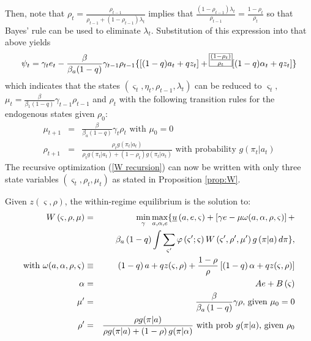 \documentclass[12pt,letter,leqno]{article}
\theoremstyle{asn}
\theoremstyle{lem}
\theoremstyle{slem}
\theoremstyle{prop}
\theoremstyle{appprop}
\theoremstyle{rem}
\theoremstyle{defn}
\begin{document}
Then, note that $\rho _{t}=\frac{\rho _{t-1}}{\rho _{t-1}+(1-\rho
_{t-1})\lambda _{t}}$ implies that $
\frac{(1-\rho _{t-1})\lambda _{t}}{\rho _{t-1}}=\frac{1-\rho _{t}}{\rho _{t}}$ 
so that Bayes' rule can be used to eliminate $\lambda _{t}$.
Substitution of this expression into that above yields%
\begin{equation}
\psi _{t}=\gamma_{t}e_{t}-\frac{\beta }{\beta_{a}(1-q)}\gamma _{t-1}\rho
_{t-1}\{[(1-q)a_{t}+qz_{t}]+\frame{$\frac{(1-\rho _{t})}{\rho _{t}}$}%
[(1-q)\alpha _{t}+qz_{t}]\}  \label{part of w (version 2)}
\end{equation}%
which indicates that the states $(\varsigma _{t},\eta _{t},\rho _{t-1},\lambda
_{t})$ can be reduced to $\varsigma _{t},$ $\mu _{t}=\frac{\beta }{\beta
_{1}(1-q)}\gamma _{t-1}\rho _{t-1}$ and $\rho _{t}$ with the following transition rules for the endogenous states given $\rho_{0}$:
\begin{eqnarray}
\mu _{t+1}&=&\frac{\beta }{\beta_{a}(1-q)}\gamma _{t}\rho _{t} \text{ with } \mu_{0}=0 \label{app:mu}\\
\rho _{t+1}&=&\frac{\rho_tg(\pi_t|a_t)}{\rho_tg(\pi_t|a_t)+(1-\rho_t)g(\pi_t|\alpha_t)} \text{ with probability $g(\pi_t |a_t)$} \label{app:rho}
\end{eqnarray}
The recursive optimization (\ref{W recursion}) can now be written with only three state variables $(\varsigma_t,\rho_t,\mu_t)$ as stated in Proposition \ref{prop:W}.
\begin{appprop}\label{prop:Wapp}%
Given $z(\varsigma ,\rho)$, the within-regime equilibrium is the solution to:
\begin{eqnarray}
W\left( \varsigma ,\rho ,\mu \right) &=&\min_{\gamma }\max_{a,\alpha
,e}\{\underline{u}\left( a,e,\varsigma \right) +\left[ \gamma e -\mu \omega(a,\alpha,\rho,\varsigma)
\right] +  \label{app:W} \\
&&\beta_{a}\left( 1-q\right) \int \sum_{\varsigma ^{\prime }}\varphi \left(
\varsigma ^{\prime };\varsigma \right) W\left( \varsigma ^{\prime },\rho
^{\prime },\mu ^{\prime }\right) g\left( \pi |a\right) d\pi \}, \notag \\
\text{with } \omega(a,\alpha,\rho,\varsigma) &\equiv& \left( 1-q\right) a+qz(\varsigma ,\rho)+\frac{1-\rho }{%
\rho }\left[ \left( 1-q\right) \alpha +qz (\varsigma ,\rho)\right]  \label{appomega} \\
\alpha &=& Ae+B\left( \varsigma \right) \\
\mu ^{\prime } &=&\frac{\beta }{\beta_{a}\left( 1-q\right) }\gamma \rho 
\text{, given }\mu _{0}=0  \label{app:mup} \\
\rho ^{\prime } &=&\frac{\rho g(\pi|a) }{\rho g(\pi|a) +\left( 1-\rho
\right) g(\pi|\alpha)} \text{ with prob $g(\pi|a)$, given $\rho_0$}  \label{app:rhop}
\end{eqnarray}
\end{appprop}%
\end{document}
